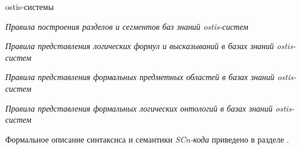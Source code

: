 \begin{SCn}
{\begin{scnvector}
\begin{scnitemize}
				            ostis-системы
				            \item \textit{Правила построения разделов и сегментов
					            баз знаний ostis-систем}
				            \item \textit{Правила представления логических формул и высказываний в базах знаний ostis-систем}
				            \item \textit{Правила представления формальных предметных областей в базах знаний ostis-систем}
				            \item \textit{Правила представления формальных логических онтологий в базах знаний ostis-систем}
			            \end{scnitemize}
			\item Формальное описание синтаксиса и семантики \textit{SCn-кода} приведено в разделе .
		\end{scnvector}
	}


\end{SCn}
